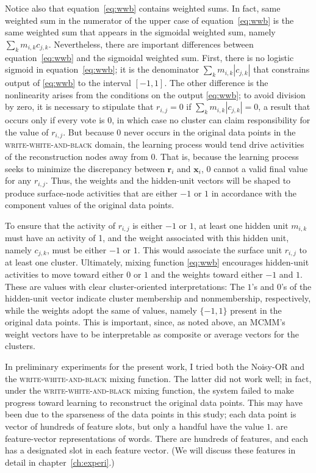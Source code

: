  Notice also that equation~\eqref{eq:wwb} contains weighted sums. In fact, same weighted sum
in the numerator of the upper case of equation~\eqref{eq:wwb} is the same weighted sum that appears in the sigmoidal weighted sum, namely $\sum\limits_{k} m_{i,k} c_{j,k}$.
 Nevertheless, there are important differences 
 between equation~\eqref{eq:wwb} and the sigmoidal weighted sum. First, there is 
 no logistic sigmoid in equation~\eqref{eq:wwb}; it is the denominator $\sum_{k} m_{i,k} |c_{j,k}|$ 
 that constrains output of \eqref{eq:wwb} to the interval $[-1,1]$. The other 
 difference is the nonlinearity arises from the conditions on the output \eqref{eq:wwb}; 
 to avoid division by zero, it is necessary to stipulate that $r_{i,j}=0$ if 
 $\sum_{k} m_{i,k} |c_{j,k}| = 0$, a result that occurs only if every vote is 0, 
 in which case no cluster can claim responsibility for the value of $r_{i,j}$. But 
 because $0$ never occurs in the original data points in the \textsc{write-white-and-black} 
 domain, the learning process would tend drive activities of the reconstruction nodes 
 away from $0$. That is, because the learning process seeks to minimize the discrepancy 
 between $\textbf{r}_i$ and $\textbf{x}_i$, $0$ cannot a valid final value for any $r_{i,j}$.  
 Thus, the weights and the hidden-unit vectors will be shaped to produce surface-node 
 activities that are either $-1$ or $1$ in accordance with the component values of 
 the original data points. 

To ensure that the activity of $r_{i,j}$ is either $-1$ or $1$, at least one hidden 
unit $m_{i,k}$ must have an activity of 1, and the weight associated with this 
hidden unit, namely $c_{j,k}$, must be either $-1$ or $1$. This would associate 
the surface unit $r_{i,j}$ to at least one cluster. Ultimately, mixing 
function \eqref{eq:wwb} encourages hidden-unit activities to move toward 
either $0$ or $1$ and the weights toward either $-1$ and $1$. These are 
values with clear cluster-oriented interpretations: The $1$'s and $0$'s of the 
hidden-unit vector indicate cluster membership and nonmembership, respectively, 
while the weights adopt the same of values, namely $\{-1, 1\}$ present in the original data points. 
This is important, since, as noted above, an MCMM's weight vectors have to be 
interpretable as composite or average vectors for the clusters.

In preliminary experiments for the present work, I tried both the Noisy-OR 
and the \textsc{write-white-and-black} mixing function. The latter did 
not work well; in fact, under the \textsc{write-white-and-black} mixing function, the system 
failed to make progress toward learning to reconstruct the original 
data points. This may have been due to the sparseness of the data points 
in this study; each data point is vector of hundreds of feature slots, but 
only a handful have the value $1$. are feature-vector representations of words. 
There are hundreds of features, and each has a designated slot in each feature vector.
(We will discuss these features in detail in chapter~\ref{ch:experi}.)

